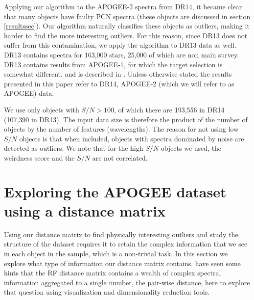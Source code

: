 \documentclass[fleqn,usenatbib]{mnras}
\begin{document}
Applying our algorithm to the APOGEE-2 spectra from DR14, it became clear that many objects have faulty PCN spectra (these objects are discussed in section \ref{resultssec}). Our algorithm naturally classifies these objects as outliers, making it harder to find the more interesting outliers. For this reason, since DR13 does not suffer from this contamination, we apply the algorithm to DR13 data as well. DR13 contains spectra for 163,000 stars, 25,000 of which are non main survey. DR13 contains results from APOGEE-1, for which the target selection is somewhat different, and is described in \citet{zasowski13}. Unless otherwise stated the results presented in this paper refer to DR14, APOGEE-2 (which we will refer to as APOGEE) data.

We use only objects with $S/N > 100$, of which there are 193,556 in DR14 (107,390 in DR13). The input data size is therefore the product of the number of objects by the number of features (wavelengths). The reason for not using low $S/N$ objects is that when included, objects with spectra dominated by noise are detected as outliers. We note that for the high $S/N$ objects we used, the weirdness score and the $S/N$ are not correlated.


\section{Exploring the APOGEE dataset using a distance matrix}
\label{sec:tsne}

Using our distance matrix to find physically interesting outliers and study the structure of the dataset requires it to retain the complex information that we see in each object in the sample, which is a non-trivial task. In this section we explore what type of information our distance matrix contains. \cite{baron17a} have seen some hints that the RF distance matrix contains a wealth of complex spectral information aggregated to a single number, the pair-wise distance, here to explore that question using visualization and dimensionality reduction tools.
\end{document}
